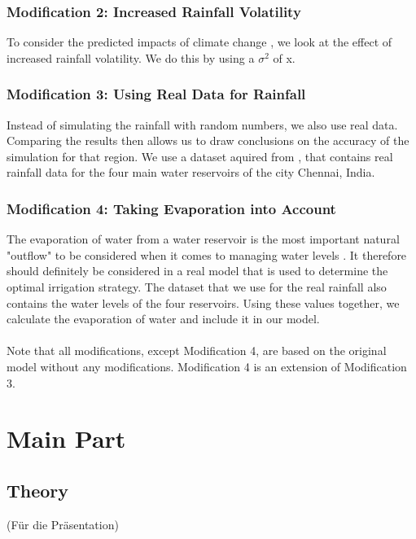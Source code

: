 \documentclass[12pt, a4paper, oneside]{article}
\begin{document}
\subsubsection{Modification 2: Increased Rainfall Volatility}
To consider the predicted impacts of climate change \citep{guhathakurta2011impact}, we look at the effect of increased rainfall volatility. 
We do this by using a  $\sigma^2$ of x.

\subsubsection{Modification 3: Using Real Data for Rainfall}
Instead of simulating the rainfall with random numbers, we also use real data.
Comparing the results then allows us to draw conclusions on the accuracy of the simulation for that region. 
We use a dataset aquired from \cite{kaggle:2019}, that contains real rainfall data for the four main water reservoirs of the city Chennai, India. %

\subsubsection{Modification 4: Taking Evaporation into Account}
The evaporation of water from a water reservoir is the most important natural "outflow" to be considered when it comes to managing water levels \citep{tanny2008evaporation}.
It therefore should definitely be considered in a real model that is used to determine the optimal irrigation strategy.
The dataset that we use for the real rainfall also contains the water levels of the four reservoirs.
Using these values together, we calculate the evaporation of water and include it in our model. \\\\


Note that all modifications, except Modification 4, are based on the original model without any modifications.
Modification 4 is an extension of Modification 3. 

	
	\section{Main Part}
	\subsection{Theory}
	(Für die Präsentation)
	
\end{document}
